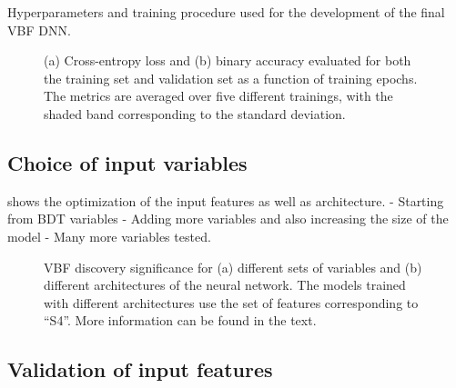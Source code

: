 \begin{table}[ht]
    \begin{center}
    
    \end{center}
    \caption{Hyperparameters and training procedure used for the development of the final VBF DNN.
    }
    \label{tab:DNN-info}
\end{table}

\begin{figure}[t]
    \caption{(a) Cross-entropy loss and (b) binary accuracy evaluated for both the training set and validation set as a function of training epochs. The metrics are averaged over five different trainings, with the shaded band corresponding to the standard deviation.}
    \label{fig:monitoring}
\end{figure}

\subsection{Choice of input variables}

 shows the optimization of the input features as well as architecture.
- Starting from BDT variables
- Adding more variables and also increasing the size of the model
- Many more variables tested. 

\begin{figure}[t]
    \caption{VBF discovery significance for (a) different sets of variables and (b) different architectures of the neural network. The models trained with different architectures use the set of features corresponding to ``S4''. More information can be found in the text.}
    \label{fig:arch-vars-optim}
\end{figure}




\subsection{Validation of input features}

